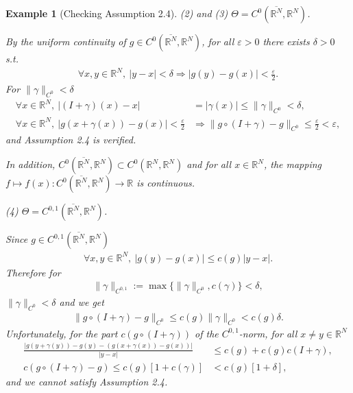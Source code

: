\documentclass{book}
\numberwithin{equation}{section}
\newtheorem{example}{Example}[section]
\begin{document}
\begin{enumerate}
\begin{example}[Checking Assumption 2.4]
        (2) and (3) $\Theta = C^0(\overline{\mathbb{R}^N},\mathbb{R}^N)$.
        
        By the uniform continuity of $g\in C^0(\overline{\mathbb{R}^N},\mathbb{R}^N)$, for all $\varepsilon > 0$ there exists $\delta > 0$ s.t.
        \begin{align*}
            \forall x,y\in\mathbb{R}^N,\ |y - x| < \delta\Rightarrow|g(y) - g(x)| < \frac{\varepsilon}{2}.
        \end{align*}
        For $\|\gamma\|_{C^0} < \delta$
        \begin{align*}
            \forall x\in\mathbb{R}^N,\ |(I + \gamma)(x) - x| &= |\gamma(x)|\le\|\gamma\|_{C^0} < \delta,\\
            \forall x\in\mathbb{R}^N,\ |g(x + \gamma(x)) - g(x)| < \frac{\varepsilon}{2}&\Rightarrow\|g\circ(I + \gamma) - g\|_{C^0}\le\frac{\varepsilon}{2} < \varepsilon,
        \end{align*}
        and Assumption 2.4 is verified.
        
        In addition, $C^0(\overline{\mathbb{R}^N},\mathbb{R}^N)\subset C^0(\mathbb{R}^N,\mathbb{R}^N)$ and for all $x\in\mathbb{R}^N$, the mapping $f\mapsto f(x): C^0(\overline{\mathbb{R}^N},\mathbb{R}^N)\to\mathbb{R}$ is continuous.
        
        (4) $\Theta = C^{0,1}(\overline{\mathbb{R}^N},\mathbb{R}^N)$.
        
        Since $g\in C^{0,1}(\overline{\mathbb{R}^N},\mathbb{R}^N)$
        \begin{align*}
            \forall x,y\in\mathbb{R}^N,\ |g(y) - g(x)|\le c(g)|y - x|.
        \end{align*}
        Therefore for
        \begin{align*}
            \|\gamma\|_{C^{0,1}} := \max\{\|\gamma\|_{C^0},c(\gamma)\} < \delta,
        \end{align*}
        $\|\gamma\|_{C^0} < \delta$ and we get
        \begin{align*}
            \|g\circ(I + \gamma) - g\|_{C^0}\le c(g)\|\gamma\|_{C^0} < c(g)\delta.
        \end{align*}
        Unfortunately, for the part $c(g\circ(I + \gamma))$ of the $C^{0,1}$-norm, for all $x\ne y\in\mathbb{R}^N$
        \begin{align*}
            \frac{|g(y + \gamma(y)) - g(y) - \left(g(x + \gamma(x)) - g(x)\right)|}{|y - x|}&\le c(g) + c(g)c(I + \gamma),\\
            c\left(g\circ(I + \gamma) - g\right)\le c(g)[1 + c(\gamma)] &< c(g)[1 + \delta],
        \end{align*}
        and we cannot satisfy Assumption 2.4.
        

\end{example}
\end{enumerate}
\end{document}
